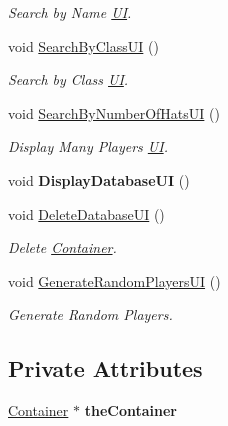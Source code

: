 \begin{DoxyCompactItemize}
\begin{DoxyCompactList}\small\item\em Search by Name \hyperlink{class_u_i}{U\+I}. \end{DoxyCompactList}\item 
void \hyperlink{class_u_i_ad6029cca26a26ebfed9db4c3448e601d}{Search\+By\+Class\+U\+I} ()
\begin{DoxyCompactList}\small\item\em Search by Class \hyperlink{class_u_i}{U\+I}. \end{DoxyCompactList}\item 
void \hyperlink{class_u_i_ac2a126e1c593109195f2c4e35fdbea3f}{Search\+By\+Number\+Of\+Hats\+U\+I} ()
\begin{DoxyCompactList}\small\item\em Display Many Players \hyperlink{class_u_i}{U\+I}. \end{DoxyCompactList}\item 
\hypertarget{class_u_i_a2d6981a563fcd2d1f9a5660db5865632}{}void {\bfseries Display\+Database\+U\+I} ()\label{class_u_i_a2d6981a563fcd2d1f9a5660db5865632}

\item 
void \hyperlink{class_u_i_a2c49259627e3939c42133aa420a39230}{Delete\+Database\+U\+I} ()
\begin{DoxyCompactList}\small\item\em Delete \hyperlink{class_container}{Container}. \end{DoxyCompactList}\item 
void \hyperlink{class_u_i_a828d5eef5d32fbeea6ecabda028a8130}{Generate\+Random\+Players\+U\+I} ()
\begin{DoxyCompactList}\small\item\em Generate Random Players. \end{DoxyCompactList}\end{DoxyCompactItemize}
\subsection*{Private Attributes}
\begin{DoxyCompactItemize}
\item 
\hypertarget{class_u_i_a413abd0e41a0ef3f32ba836de8c406bc}{}\hyperlink{class_container}{Container} $\ast$ {\bfseries the\+Container}\label{class_u_i_a413abd0e41a0ef3f32ba836de8c406bc}

\end{DoxyCompactItemize}



